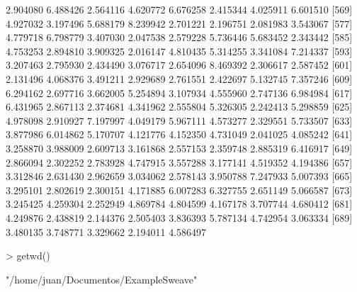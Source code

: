 \documentclass[12pt]{article}
\begin{document}
\begin{Schunk}
\begin{Soutput}
[561] 2.904080 6.488426 2.564116 4.620772 6.676258 2.415344 4.025911 6.601510
[569] 4.927032 3.197496 5.688179 8.239942 2.701221 2.196751 2.081983 3.543067
[577] 4.779718 6.798779 3.407030 2.047538 2.579228 5.736446 5.683452 2.343442
[585] 4.753253 2.894810 3.909325 2.016147 4.810435 5.314255 3.341084 7.214337
[593] 3.207463 2.795930 2.434490 3.076717 2.654096 8.469392 2.306617 2.587452
[601] 2.131496 4.068376 3.491211 2.929689 2.761551 2.422697 5.132745 7.357246
[609] 6.294162 2.697716 3.662005 5.254894 3.107934 4.555960 2.747136 6.984984
[617] 6.431965 2.867113 2.374681 4.341962 2.555804 5.326305 2.242413 5.298859
[625] 4.978098 2.910927 7.197997 4.049179 5.967111 4.573277 2.329551 5.733507
[633] 3.877986 6.014862 5.170707 4.121776 4.152350 4.731049 2.041025 4.085242
[641] 3.258870 3.988009 2.609713 3.161868 2.557153 2.359748 2.885319 6.416917
[649] 2.866094 2.302252 2.783928 4.747915 3.557288 3.177141 4.519352 4.194386
[657] 3.312846 2.631430 2.962659 3.034062 2.578143 3.950788 7.247933 5.007393
[665] 3.295101 2.802619 2.300151 4.171885 6.007283 6.327755 2.651149 5.066587
[673] 3.245425 4.259304 2.252949 4.869784 4.804599 4.167178 3.707744 4.680412
[681] 4.249876 2.438819 2.144376 2.505403 3.836393 5.787134 4.742954 3.063334
[689] 3.480135 3.748771 3.329662 2.194011 4.586497
\end{Soutput}
\begin{Sinput}
> getwd()
\end{Sinput}
\begin{Soutput}
[1] "/home/juan/Documentos/ExampleSweave"
\end{Soutput}
\end{Schunk}
\end{document}

